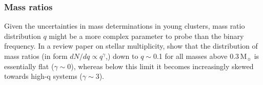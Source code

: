 \documentclass[a4paper,fleqn,usenatbib]{mnras}
\begin{document}
 

\subsubsection{Mass ratios}
Given the uncertainties in mass determinations in young clusters, mass ratio distribution $q$ might be a more complex parameter to probe than the
binary frequency. In a review paper on stellar multiplicity, \citet{duchene&kraus13} show that the distribution 
of mass ratios (in form $dN/dq \propto q^\gamma$,) down to $q\sim$0.1 for all masses above 0.3\,M$_{\sun}$ is essentially flat ($\gamma \sim 0$), whereas 
below this limit it becomes increasingly skewed towards high-q systems ($\gamma \sim 3$). 

\end{document}
